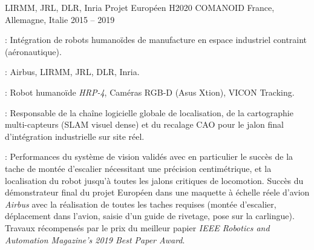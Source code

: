 \begin{cventries}
  \cventry
  {LIRMM, JRL, DLR, Inria} %
  {Projet Européen H2020 COMANOID} %
  {France, Allemagne, Italie} %
  {2015 -- 2019} %
  {
    \begin{cvitems}
    \item {} : Intégration de robots humanoïdes de manufacture en espace
      industriel contraint (aéronautique).
    \item {} : Airbus, LIRMM, JRL, DLR, Inria.
    \item {} : Robot humanoïde \emph{HRP-4}, Caméras RGB-D
      (Asus Xtion), VICON Tracking.
    \item {} : Responsable de la chaîne logicielle globale de localisation, de la
      cartographie multi-capteurs (SLAM visuel dense) et du recalage CAO pour le jalon final d'intégration
      industrielle sur site réel.
    \item {} : Performances du système de vision validés avec en particulier le
      succès de la tache de montée d'escalier nécessitant une précision centimétrique, et la localisation du
      robot jusqu'à toutes les jalons critiques de locomotion. Succès du démonstrateur final du projet
      Européen dans une maquette à échelle réele d'avion \emph{Airbus} avec la réalisation de toutes les
      taches requises (montée d'escalier, déplacement dans l'avion, saisie d'un guide de rivetage, pose sur
      la carlingue). Travaux récompensés par le prix du meilleur papier \emph{IEEE Robotics and Automation
      Magazine’s 2019 Best Paper Award}.
    \end{cvitems}
  }


\end{cventries}
